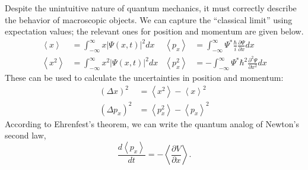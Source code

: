 \documentclass[../p052main.tex]{subfiles}
\begin{document}
\begin{summary}
    Despite the unintuitive nature of quantum mechanics, it must correctly describe the behavior of macroscopic objects.
    We can capture the ``classical limit'' using expectation values; the relevant ones for position and momentum are given below.
    \begin{align*}
        \left< x \right> &= \int_{-\infty}^{\infty} x |\Psi(x,t)|^2dx & \left< p_x \right> &= \int_{-\infty}^\infty \Psi^* \frac{\hbar}{i} \frac{\partial \Psi}{\partial x} dx \\
        \left< x^2 \right> &= \int_{-\infty}^{\infty} x^2 |\Psi(x,t)|^2dx & \left< p_x^2 \right> &= -\int_{-\infty}^\infty \Psi^* \hbar^2 \frac{\partial^2 \Psi}{\partial x^2} dx
    \end{align*}
    These can be used to calculate the uncertainties in position and momentum:
    \begin{align*}
        (\Delta x)^2 &= \left< x^2 \right> - \left< x \right>^2 \\
        (\Delta p_x)^2 &= \left< p_x^2 \right> - \left< p_x \right>^2
    \end{align*}
    According to Ehrenfest's theorem, we can write the quantum analog of Newton's second law,
    \[ \frac{d \left< p_x \right>}{dt} = -\left< \frac{\partial V}{\partial x} \right>. \]
\end{summary}
\end{document}
